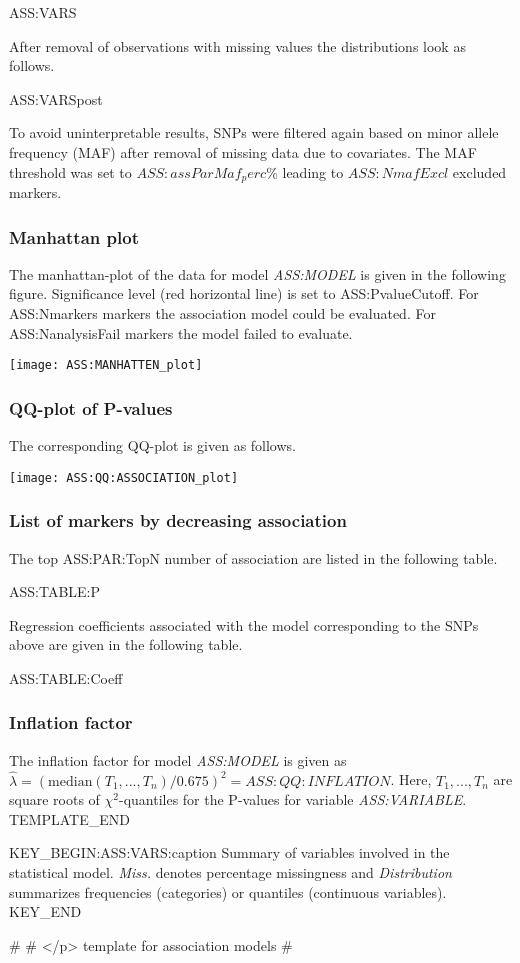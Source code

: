 ASS:VARS

After removal of observations with missing values the distributions look as follows.

ASS:VARSpost

To avoid uninterpretable results, SNPs were filtered again based on minor allele frequency (MAF) after removal of missing data due to covariates. The MAF threshold was set to $ASS:assParMaf_perc\%$ leading to $ASS:NmafExcl$ excluded markers.

\subsubsection{Manhattan plot}

The manhattan-plot of the data for model \emph{ASS:MODEL} is given in the following figure. Significance level (red horizontal line) is set to ASS:PvalueCutoff. For ASS:Nmarkers markers the association model could be evaluated. For ASS:NanalysisFail markers the model failed to evaluate.

\begin{center}
	\texttt{[image: ASS:MANHATTEN\_plot]}
\end{center}

\subsubsection{QQ-plot of P-values}

The corresponding QQ-plot is given as follows.

\begin{center}
	\texttt{[image: ASS:QQ:ASSOCIATION\_plot]}
\end{center}

\subsubsection{List of markers by decreasing association}

The top ASS:PAR:TopN number of association are listed in the following table.

ASS:TABLE:P

Regression coefficients associated with the model corresponding to the SNPs above are given in the following table.

ASS:TABLE:Coeff


\subsubsection{Inflation factor}

The inflation factor for model \emph{ASS:MODEL} is given as $\hat \lambda = (\mathrm{median}(T_1, ..., T_n)/0.675)^2 = ASS:QQ:INFLATION$. Here, $T_1, ..., T_n$ are square roots of $\chi^2$-quantiles for the P-values for variable \emph{ASS:VARIABLE}.
TEMPLATE_END

KEY_BEGIN:ASS:VARS:caption
Summary of variables involved in the statistical model. {\it Miss.} denotes percentage missingness and {\it Distribution} summarizes frequencies (categories) or quantiles (continuous variables).
KEY_END

#
#	</p> template for association models
#

